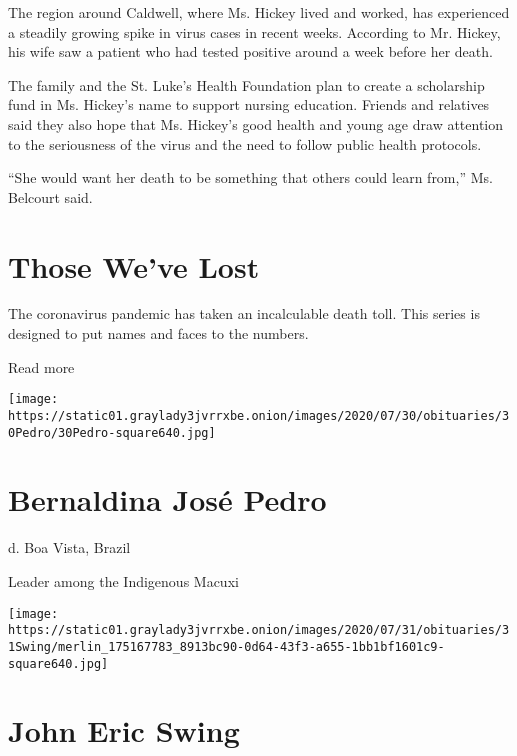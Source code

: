 The region around Caldwell, where Ms. Hickey lived and worked, has
experienced a steadily growing spike in virus cases in recent weeks.
According to Mr. Hickey, his wife saw a patient who had tested positive
around a week before her death.

The family and the St. Luke's Health Foundation plan to create a
scholarship fund in Ms. Hickey's name to support nursing education.
Friends and relatives said they also hope that Ms. Hickey's good health
and young age draw attention to the seriousness of the virus and the
need to follow public health protocols.

``She would want her death to be something that others could learn
from,'' Ms. Belcourt said.

\href{https://www.nytimes3xbfgragh.onion/interactive/2020/obituaries/people-died-coronavirus-obituaries.html?action=click\&pgtype=Article\&state=default\&region=BELOW_MAIN_CONTENT\&context=covid_obits_promo}{}

\hypertarget{those-weve-lost}{%
\section{Those We've Lost}\label{those-weve-lost}}

The coronavirus pandemic has taken an incalculable death toll. This
series is designed to put names and faces to the numbers.

Read more

\texttt{[image: https://static01.graylady3jvrrxbe.onion/images/2020/07/30/obituaries/30Pedro/30Pedro-square640.jpg]}

\hypertarget{bernaldina-josuxe9-pedro}{%
\section{Bernaldina José Pedro}\label{bernaldina-josuxe9-pedro}}

d. Boa Vista, Brazil

Leader among the Indigenous Macuxi

\texttt{[image: https://static01.graylady3jvrrxbe.onion/images/2020/07/31/obituaries/31Swing/merlin\_175167783\_8913bc90-0d64-43f3-a655-1bb1bf1601c9-square640.jpg]}

\hypertarget{john-eric-swing}{%
\section{John Eric Swing}\label{john-eric-swing}}

